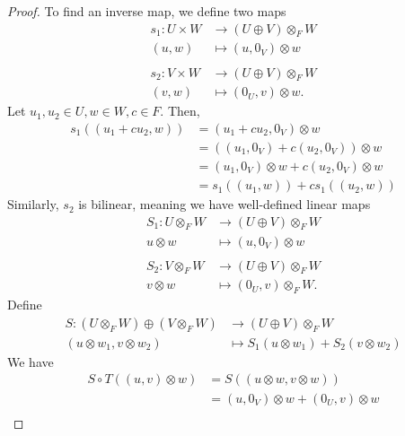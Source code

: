 \documentclass[10pt]{mypackage}
\begin{document}
\begin{proof}
    To find an inverse map, we define two maps
    \begin{align*}
      s_1: U\times W &\rightarrow \left(U\oplus V\right)\otimes_{F} W\\
      \left(u,w\right) &\mapsto \left(u,0_V\right)\otimes w\\
      \\
      s_2: V\times W &\rightarrow \left(U\oplus V\right)\otimes_{F} W\\
      \left(v,w\right) &\mapsto \left(0_{U},v\right)\otimes w.
    \end{align*}
    Let $u_1,u_2\in U, w\in W, c\in F$. Then,
    \begin{align*}
      s_1\left(\left(u_1 + cu_2,w\right)\right) &= \left(u_1 + cu_2,0_V\right) \otimes w\\
                                                &= \left(\left(u_1,0_V\right)+ c\left(u_{2},0_{V}\right)\right)\otimes w\\
                                                &= \left(u_1,0_V\right)\otimes w+ c\left(u_{2},0_{V}\right)\otimes w\\
                                                &= s_1\left(\left(u_1,w\right)\right) + c s_1\left(\left(u_2,w\right)\right)
    \end{align*}
    Similarly, $s_2$ is bilinear, meaning we have well-defined linear maps
    \begin{align*}
      S_1: U\otimes_{F} W&\rightarrow \left(U\oplus V\right)\otimes_{F} W\\
      u\otimes w &\mapsto \left(u,0_V\right)\otimes w\\
      \\
      S_2: V\otimes_{F} W &\rightarrow \left(U\oplus V\right)\otimes_{F} W\\
      v\otimes w &\mapsto \left(0_{U},v\right)\otimes_{F} W.
    \end{align*}
    Define
    \begin{align*}
      S: \left(U\otimes_{F}W\right)\oplus \left(V\otimes_{F} W\right) &\rightarrow \left(U\oplus V\right)\otimes_{F}W\\
      \left(u\otimes w_1,v\otimes w_2\right) &\mapsto S_1\left(u\otimes w_1\right) + S_2\left(v\otimes w_2\right)
    \end{align*}
    We have
    \begin{align*}
      S\circ T\left(\left(u,v\right)\otimes w\right) &= S\left(\left(u\otimes w, v\otimes w\right)\right)\\
                                                     &= \left(u,0_V\right)\otimes w + \left(0_U,v\right)\otimes w\\

\end{align*}
\end{proof}
\end{document}
